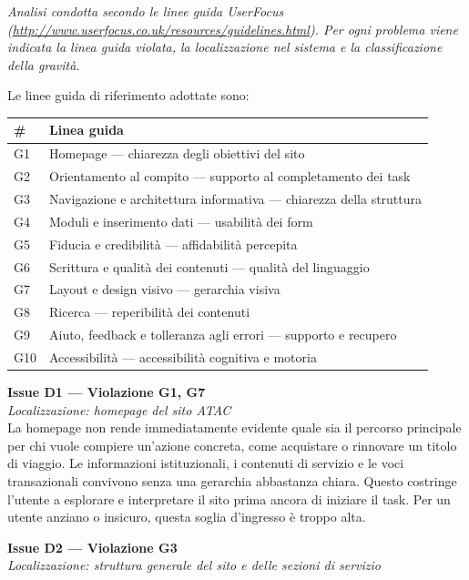 \documentclass[11pt,a4paper]{article}
\begin{document}
\noindent\textit{Analisi condotta secondo le linee guida UserFocus (\url{http://www.userfocus.co.uk/resources/guidelines.html}). Per ogni problema viene indicata la linea guida violata, la localizzazione nel sistema e la classificazione della gravità.}

\bigskip

\noindent Le linee guida di riferimento adottate sono:

\begin{tabular}{ll}
\hline
\textbf{\#} & \textbf{Linea guida} \\
\hline
G1 & Homepage — chiarezza degli obiettivi del sito \\
G2 & Orientamento al compito — supporto al completamento dei task \\
G3 & Navigazione e architettura informativa — chiarezza della struttura \\
G4 & Moduli e inserimento dati — usabilità dei form \\
G5 & Fiducia e credibilità — affidabilità percepita \\
G6 & Scrittura e qualità dei contenuti — qualità del linguaggio \\
G7 & Layout e design visivo — gerarchia visiva \\
G8 & Ricerca — reperibilità dei contenuti \\
G9 & Aiuto, feedback e tolleranza agli errori — supporto e recupero \\
G10 & Accessibilità — accessibilità cognitiva e motoria \\
\hline
\end{tabular}

\bigskip

\noindent\textbf{Issue D1 — Violazione G1, G7}\label{atac:D1}\\
\textit{Localizzazione: homepage del sito ATAC}\\

\noindent La homepage non rende immediatamente evidente quale sia il percorso principale per chi vuole compiere un’azione concreta, come acquistare o rinnovare un titolo di viaggio. Le informazioni istituzionali, i contenuti di servizio e le voci transazionali convivono senza una gerarchia abbastanza chiara. Questo costringe l’utente a esplorare e interpretare il sito prima ancora di iniziare il task. Per un utente anziano o insicuro, questa soglia d’ingresso è troppo alta.

\bigskip

\noindent\textbf{Issue D2 — Violazione G3}\label{atac:D2}\\
\textit{Localizzazione: struttura generale del sito e delle sezioni di servizio}\\
\end{document}
